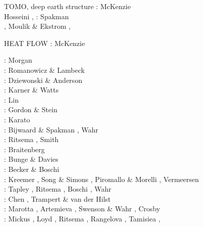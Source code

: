 
TOMO, deep earth structure 
\nineteensixtyseven: McKenzie \cite{mcke67}\\
\twothousandeighteen Hosseini \etal \cite{homs18},
\nineteenninetyone: Spakman \cite{spak91}\\
, Moulik \& Ekstrom \cite{moek16}, 



HEAT FLOW
\nineteensixtyseven: McKenzie \cite{mcke67}\\

 
\begin{scriptsize}
\nineteensixtyfive: Morgan \cite{morg65}\\
\nineteenseventyseven: Romanowicz \& Lambeck \cite{rola77}\\
\nineteeneightyone: Dziewonski \& Anderson \cite{dzan81}\\
\nineteeneightythree: Karner \& Watts \cite{kawa83}\\
\nineteenninety: Lin \etal \cite{lips90}\\
\nineteenninetytwo: Gordon \& Stein \cite{gost92}\\
\nineteenninetythree: Karato \cite{kara93}\\
\nineteenninetyeight: Bijwaard \& Spakman \cite{bisp98}, Wahr \etal \cite{wamb98}\\
\nineteenninetynine: Ritsema \etal \cite{rivw99}, Smith \etal \cite{smst99} \\
\twothousand: Braitenberg \etal \cite{brzf00}\\
\twothousandone: Bunge \& Davies \cite{buda01}\\
\twothousandtwo: Becker \& Boschi \cite{bebo02}\\
\twothousandthree: Kreemer \etal \cite{krhh03}, Song \& Simons \cite{sosi03}, 
                   Piromallo \& Morelli \cite{pimo03}, Vermeersen \cite{verm03}\\
\twothousandfour: Tapley \etal \cite{tabr04}, Ritsema \etal \cite{rivw04}, Boschi \etal \cite{boek04},
                  Wahr \etal \cite{wasz04}\\
\twothousandfive: Chen \etal \cite{chrw05}, Trampert \& van der Hilst \cite{trva05}\\
\twothousandsix: Marotta \etal \cite{masr06}, Artemieva \cite{arte06}, 
                 Swenson \& Wahr \cite{swwa06}, Crosby \etal \cite{crms06}\\
\twothousandseven: Mickus \etal \cite{mitk07}, Loyd \etal \cite{lobc07}, Ritsema \etal \cite{rimb07}, 
                   Rangelova \etal \cite{ravb07}, Tamisiea \etal \cite{tamd07}, 

\end{scriptsize}
